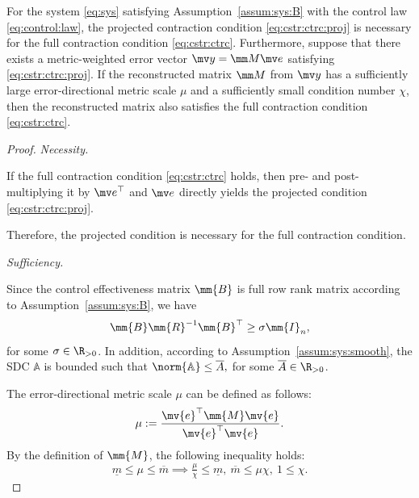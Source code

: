 \documentclass[lettersize,journal]{IEEEtran}
\begin{document}
\begin{theorem} \label{thm:proj:ctrc:suff}
   For the system \eqref{eq:sys} satisfying Assumption~\ref{assum:sys:B} with the control law \eqref{eq:control:law}, the projected contraction condition \eqref{eq:cstr:ctrc:proj} is necessary for the full contraction condition \eqref{eq:cstr:ctrc}.
   Furthermore, suppose that there exists a metric-weighted error vector $\mv y=\mm M\mv e$ satisfying \eqref{eq:cstr:ctrc:proj}.
   If the reconstructed matrix $\mm M$ from $\mv y$ has a sufficiently large error-directional metric scale $\mu$ and a sufficiently small condition number $\chi$, then the reconstructed matrix also satisfies the full contraction condition \eqref{eq:cstr:ctrc}.
\end{theorem}

\begin{proof}

   \emph{Necessity.}

   If the full contraction condition \eqref{eq:cstr:ctrc} holds, then pre- and post-multiplying it by $\mv e^\top$ and $\mv e$ directly yields the projected condition \eqref{eq:cstr:ctrc:proj}.

   Therefore, the projected condition is necessary for the full contraction condition.

   \emph{Sufficiency.}

   Since the control effectiveness matrix $\mm{B}$ is full row rank matrix according to Assumption~\ref{assum:sys:B}, we have 
   \begin{equation}
      \mm{B}\mm{R}^{-1}\mm{B}^\top 
      \ge
      \sigma \mm{I}_n
      ,
   \end{equation}
   for some $\sigma\in\R_{>0}$.
   In addition, according to Assumption~\ref{assum:sys:smooth}, the SDC $\mathbb{A}$ is bounded such that $\norm{\mathbb{A}} \le \overline{A},$ for some $\overline{A}\in\R_{>0}$.

   The error-directional metric scale $\mu$ can be defined as follows:
   \begin{equation}
      \mu
      :=
      \frac{\mv{e}^\top\mm{M}\mv{e}}{\mv{e}^\top\mv{e}}
      .
   \end{equation}
   By the definition of $\mm{M}$, the following inequality holds:
   \begin{equation} \label{eq:mu:bounds}
      \underline{m}
      \le
      \mu
      \le
      \overline{m}
      \implies
      \tfrac{\mu}{\chi}
      \le 
      \underline{m}
      ,\ 
      \overline{m}
      \le
      \mu \chi
      ,\ 
      1
      \le 
      \chi 
      .
   \end{equation}


\end{proof}
\end{document}
